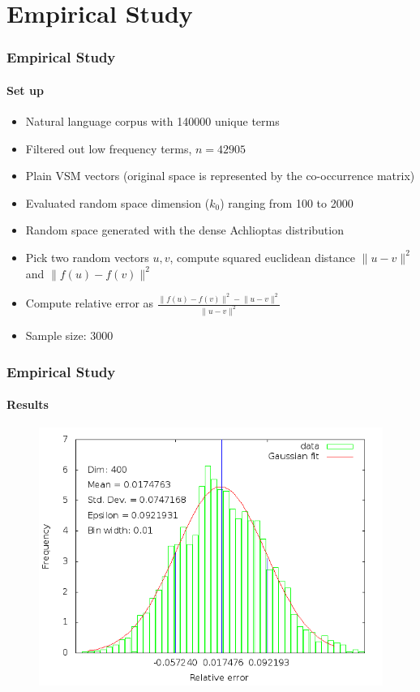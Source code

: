 \documentclass{beamer}
\begin{document}
\section{Empirical Study}

\begin{frame}
\frametitle{Empirical Study}
\framesubtitle{Set up}
\begin{itemize}
  \item Natural language corpus with 140000 unique terms
  \item Filtered out low frequency terms, $n=42905$
  \item Plain VSM vectors (original space is represented by the co-occurrence matrix)
  \item Evaluated random space dimension ($k_{0}$) ranging from 100 to 2000
  \item Random space generated with the dense Achlioptas distribution
  \item Pick two random vectors $u, v$, compute squared euclidean distance $\lVert u-v \rVert^{2}$ and $\lVert f(u)-f(v) \rVert^{2}$
  \item Compute relative error as $\frac{\lVert f(u)-f(v) \rVert^{2}-\lVert u-v \rVert^{2}}{\lVert u-v \rVert^{2}}$ 
  \item Sample size: $3000$
  \end{itemize}
\end{frame}


\begin{frame}
\frametitle{Empirical Study}
\framesubtitle{Results}
  		\begin{figure}
		\includegraphics[scale=0.46]{histogram400.png}
	\end{figure}
\end{frame}
\end{document}
